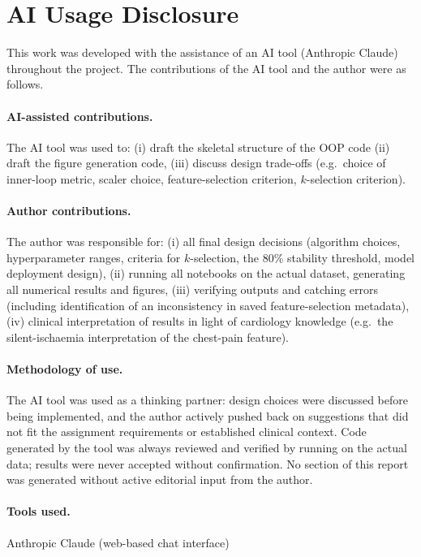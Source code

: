 \section*{AI Usage Disclosure}
\label{sec:ai_disclosure}

This work was developed with the assistance of an AI tool (Anthropic Claude) throughout the project. The contributions of the AI tool and the author were as follows.

\paragraph{AI-assisted contributions.} The AI tool was used to: (i) draft the skeletal structure of the OOP code (ii) draft the figure generation code, (iii) discuss design trade-offs (e.g.~choice of inner-loop metric, scaler choice, feature-selection criterion, $k$-selection criterion).

\paragraph{Author contributions.} The author was responsible for: (i) all final design decisions (algorithm choices, hyperparameter ranges, criteria for $k$-selection, the 80\% stability threshold, model deployment design), (ii) running all notebooks on the actual dataset, generating all numerical results and figures, (iii) verifying outputs and catching errors (including identification of an inconsistency in saved feature-selection metadata), (iv) clinical interpretation of results in light of cardiology knowledge (e.g.~the silent-ischaemia interpretation of the chest-pain feature).

\paragraph{Methodology of use.} The AI tool was used as a thinking partner: design choices were discussed before being implemented, and the author actively pushed back on suggestions that did not fit the assignment requirements or established clinical context. Code generated by the tool was always reviewed and verified by running on the actual data; results were never accepted without confirmation. No section of this report was generated without active editorial input from the author.

\paragraph{Tools used.} Anthropic Claude (web-based chat interface)
